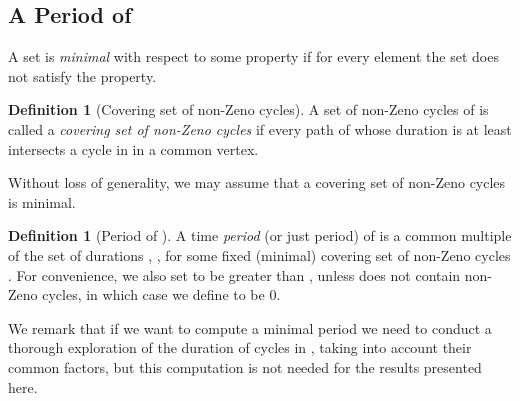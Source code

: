 \documentclass[11pt]{amsart}
\theoremstyle{definition}
\newtheorem{definition}[theorem]{Definition}
\begin{document}
\subsection{A Period of }
A set  is \emph{minimal} with respect to some property if for every element  the set  does not satisfy the property.
\begin{definition}[Covering set of non-Zeno cycles]
A set  of non-Zeno cycles of  is called a \emph{covering set of non-Zeno cycles} if every path  of  whose duration  is at least  intersects a cycle in  in a common vertex.
\end{definition}
Without loss of generality, we may assume that a covering set of non-Zeno cycles is minimal.
\begin{definition}[Period of ]
A time \emph{period} (or just period)  of  is a common multiple of the set of durations , , for
some fixed (minimal) covering set of non-Zeno cycles .
For convenience, we also set  to be greater than , unless  does not contain non-Zeno cycles, in which case we define  to be 0.
\end{definition}

We remark that if we want to compute a minimal period  we need to conduct a thorough exploration of the duration of cycles in , taking into account their common factors, but this computation is not needed for the results presented here.
\end{document}
